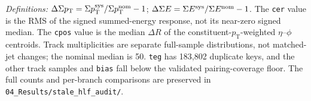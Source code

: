 \begin{table}[!ht]
\begin{minipage}{\textwidth}\footnotesize
\emph{Definitions:} $\Delta\Sigma p_{\mathrm T}=\Sigma p_{\mathrm T}^{\rm sys}/
\Sigma p_{\mathrm T}^{\rm nom}-1$; $\Delta\Sigma E=\Sigma E^{\rm sys}/
\Sigma E^{\rm nom}-1$. The \texttt{cer} value is the RMS of the signed
summed-energy response, not its near-zero signed median. The \texttt{cpos}
value is the median $\Delta R$ of the constituent-$p_{\mathrm T}$-weighted
$\eta$--$\phi$ centroids. Track multiplicities are separate full-sample
distributions, not matched-jet changes; the nominal median is 50.
\texttt{teg} has 183{,}802 duplicate keys, and the other track samples
and \texttt{bias} fall below the validated pairing-coverage floor.
The full counts and per-branch comparisons are preserved in
\texttt{04\_Results/stale\_hlf\_audit/}.
\end{minipage}
\end{table}
